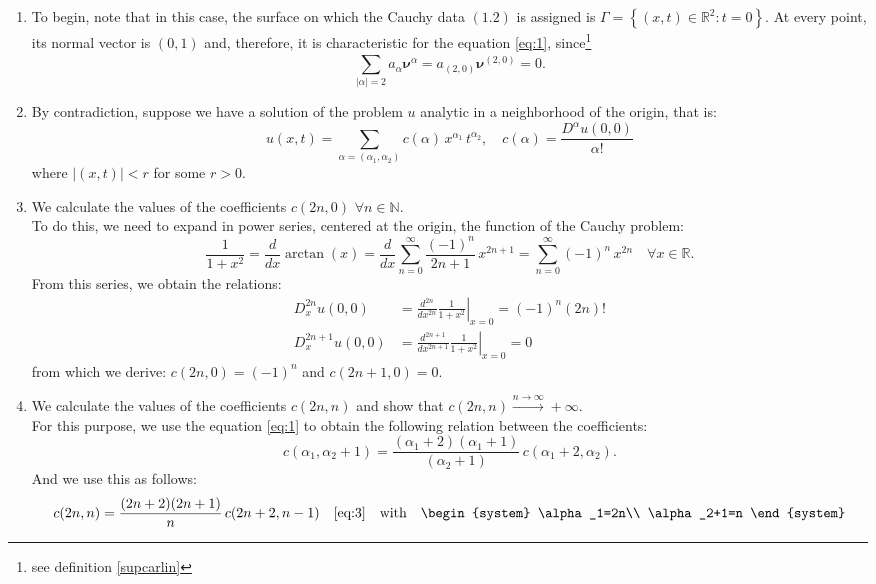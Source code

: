 \begin{enumerate}
\item
To begin, note that in this case, the surface on which the Cauchy data $(1.2)$ is assigned is
$\Gamma=\left\lbrace(x,t) \in \mathbb{R}^2:t=0\right\rbrace$. At every point, its normal vector is $(0,1)$ and, therefore, it is characteristic for the equation \eqref{eq:1}, since\footnote{see definition \ref{supcarlin}}
$$\sum_{|\alpha|=2}^{\;} a_\alpha \boldsymbol{\nu}^\alpha = a_{(2,0)}\boldsymbol{\nu}^{(2,0)} = 0. $$
\item
By contradiction, suppose we have a solution of the problem $u$ analytic in a neighborhood of the origin, that is:
$$u(x,t) = \sum_{\alpha = (\alpha_1, \alpha_2) }^{\;} c(\alpha) \, x^{\alpha_1} \, t ^{\alpha_2}, \quad
 c(\alpha) = \frac{D^\alpha u(0,0)}{\alpha!}$$
where $|(x,t)|<r$ for some $r>0$.
\item
We calculate the values of the coefficients $c(2n,0)$ $\forall n \in \mathbb{N}$.\\
To do this, we need to expand in power series, centered at the origin, the function of the Cauchy problem:
$$\frac{1}{1+x^2} = \frac{d}{dx}\arctan(x) = \frac{d}{dx}\sum_{n=0}^{\infty}\frac{(-1)^n}{2n+1} \, x^{2n+1} 
= \sum_{n=0}^{\infty}(-1)^n \, x^{2n} \quad \forall x \in \mathbb{R}.$$
From this series, we obtain the relations:
\begin{align*}
D_x^{2n}u(0,0) &= \frac{d^{2n}}{dx^{2n}} \left. \frac{1}{1+x^2}\right|_{x=0} = (-1)^n (2n)!\\
D_x^{2n+1}u(0,0) &= \frac{d^{2n+1}}{dx^{2n+1}} \left. \frac{1}{1+x^2} \right|_{x=0} = 0
\end{align*} 
from which we derive: $c(2n,0)=(-1)^n$ and $c(2n+1,0)=0$.
\item
We calculate the values of the coefficients $c(2n,n)$ and show that $c(2n,n) \xrightarrow{n\rightarrow\infty} +\infty$.\\
For this purpose, we use the equation \eqref{eq:1} to obtain the following relation between the coefficients:
\begin{equation} 
\label{eq:3}
c(\alpha_1,\alpha_2+1) = \frac{(\alpha_1+2)(\alpha_1+1)}{(\alpha_2+1)} \, c(\alpha_1+2,\alpha_2).
\end{equation}
And we use this as follows:
\begin{align*}
c(2n,n) &= \frac{(2n+2)(2n+1)}{n} \, c(2n+2,n-1)   &\eqref{eq:3}\quad\text{with} \quad 
\begin{system}
\alpha_1=2n\\
\alpha_2+1=n
\end{system}\\

\end{align*}
\end{enumerate}
